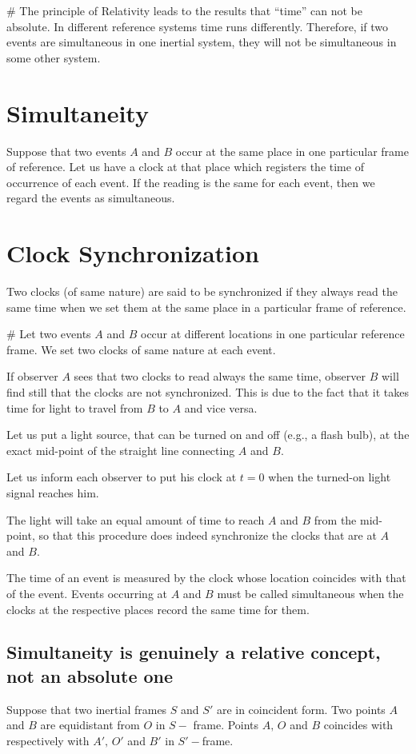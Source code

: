 \documentclass[../main-sheet.tex]{subfiles}
\begin{document}
\# The principle of Relativity leads to the results that ``time'' can not be absolute. In different reference systems time runs differently. Therefore, if two events are simultaneous in one inertial system, they will not be simultaneous in some other system.
\section{Simultaneity}
Suppose that two events \(A \) and \(B \) occur at the same place in one particular frame of reference. Let us have a clock at that place which registers the time of occurrence of each event. If the reading is the same for each event, then we regard the events as simultaneous.
\section{Clock Synchronization}
Two clocks (of same nature) are said to be synchronized if they always read the same time when we set them at the same place in a particular frame of reference.

\# Let two events \(A \) and \(B \) occur at different locations in one particular reference frame. We set two clocks of same nature at each event.

If observer \(A \) sees that two clocks to read always the same time, observer \(B \) will find still that the clocks are not synchronized. This is due to the fact that it takes time for light to travel from \(B \) to \(A \) and vice versa.

Let us put a light source, that can be turned on and off (e.g., a flash bulb), at the exact mid-point of the straight line connecting \(A \) and \(B \). 

Let us inform each observer to put his clock at \(t=0\) when the turned-on light signal reaches him.

The light will take an equal amount of time to reach \(A \) and \(B \) from the mid-point, so that this procedure does indeed synchronize the clocks that are at \(A \) and \(B \).

The time of an event is measured by the clock whose location coincides with that of the event. Events occurring at \(A \) and \(B \) must be called simultaneous when the clocks at the respective places record the same time for them.


\subsection{Simultaneity is genuinely a relative concept, not an absolute one}
Suppose that two inertial frames \(S \) and \(S'\) are in coincident form. Two points \(A \) and \(B \) are equidistant from \(O \) in \(S -\) frame. Points \(A,\,O \) and \(B \) coincides with respectively with \(A',\,O'\) and \(B'\) in \(S'-\)frame.
\end{document}
